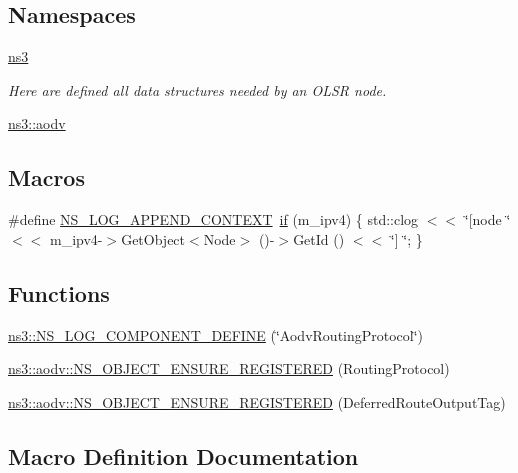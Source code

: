\subsection*{Namespaces}
\begin{DoxyCompactItemize}
\item 
 \hyperlink{namespacens3}{ns3}
\begin{DoxyCompactList}\small\item\em Here are defined all data structures needed by an O\+L\+SR node. \end{DoxyCompactList}\item 
 \hyperlink{namespacens3_1_1aodv}{ns3\+::aodv}
\end{DoxyCompactItemize}
\subsection*{Macros}
\begin{DoxyCompactItemize}
\item 
\#define \hyperlink{aodv-routing-protocol_8cc_abe50035652d407c40bdaef78214c4955}{N\+S\+\_\+\+L\+O\+G\+\_\+\+A\+P\+P\+E\+N\+D\+\_\+\+C\+O\+N\+T\+E\+XT}~\hyperlink{loss__OH__large__cities__urban_8m_ac77b6cfa3068152087725fe54b4ae8c8}{if} (m\+\_\+ipv4) \{ std\+::clog $<$$<$ \char`\"{}\mbox{[}node \char`\"{} $<$$<$ m\+\_\+ipv4-\/$>$Get\+Object$<$Node$>$ ()-\/$>$Get\+Id () $<$$<$ \char`\"{}\mbox{]} \char`\"{}; \}
\end{DoxyCompactItemize}
\subsection*{Functions}
\begin{DoxyCompactItemize}
\item 
\hyperlink{namespacens3_af9bee6f5f699ea258da0f334098dee79}{ns3\+::\+N\+S\+\_\+\+L\+O\+G\+\_\+\+C\+O\+M\+P\+O\+N\+E\+N\+T\+\_\+\+D\+E\+F\+I\+NE} (\char`\"{}Aodv\+Routing\+Protocol\char`\"{})
\item 
\hyperlink{namespacens3_1_1aodv_a4c69a0104d7cf11db0181a8bec658e8e}{ns3\+::aodv\+::\+N\+S\+\_\+\+O\+B\+J\+E\+C\+T\+\_\+\+E\+N\+S\+U\+R\+E\+\_\+\+R\+E\+G\+I\+S\+T\+E\+R\+ED} (Routing\+Protocol)
\item 
\hyperlink{namespacens3_1_1aodv_a53cf7f5ba94c22936a05668f36120e53}{ns3\+::aodv\+::\+N\+S\+\_\+\+O\+B\+J\+E\+C\+T\+\_\+\+E\+N\+S\+U\+R\+E\+\_\+\+R\+E\+G\+I\+S\+T\+E\+R\+ED} (Deferred\+Route\+Output\+Tag)
\end{DoxyCompactItemize}


\subsection{Macro Definition Documentation}
